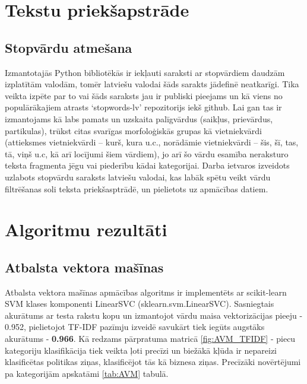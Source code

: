 \section{Tekstu priekšapstrāde}
\subsection{Stopvārdu atmešana}
Izmantotajās Python bibliotēkās ir iekļauti saraksti ar stopvārdiem daudzām izplatītām valodām, tomēr latviešu valodai šāds sarakts jādefinē neatkarīgi. Tika veikta izpēte par to vai šāds saraksts jau ir publiski pieejams un kā viens no populārākajiem atrasts ‘stopwords-lv’ repozitorijs iekš github. Lai gan tas ir izmantojams kā labs pamats un uzskaita palīgvārdus (saikļus, prievārdus, partikulas), trūkst citas svarīgas morfoloģiskās grupas kā vietniekvārdi (attieksmes vietniekvārdi – kurš, kura u.c., norādāmie vietniekvārdi – šis, šī, tas, tā, viņš u.c, kā arī locījumi šiem vārdiem), jo arī šo vārdu esamība neraksturo teksta fragmenta jēgu vai piederību kādai kategorijai. Darba ietvaros izveidots uzlabots stopvārdu saraksts latviešu valodai, kas labāk spētu veikt vārdu filtrēšanas soli teksta priekšasptrādē, un pielietots uz apmācības datiem. 

\clearpage

\section{Algoritmu rezultāti}
\subsection{Atbalsta vektora mašīnas}

Atbalsta vektora mašīnas apmācības algoritms ir implementēts ar scikit-learn SVM klases komponenti LinearSVC (sklearn.svm.LinearSVC). Sasniegtais akurātums ar testa rakstu kopu un izmantojot vārdu maisa vektorizācijas pieeju -  0.952, pielietojot TF-IDF pazīmju izveidē savukārt tiek iegūts augstāks akurātums - \textbf{0.966}. Kā redzams pārpratuma matricā \ref{fig:AVM_TFIDF} - piecu kategoriju klasifikācija tiek veikta ļoti precīzi un biežākā kļūda ir nepareizi klasificētas politikas ziņas, klasificējot tās kā biznesa ziņas. Precīzāki novērtējumi pa kategorijām apskatāmi \ref{tab:AVM} tabulā.

